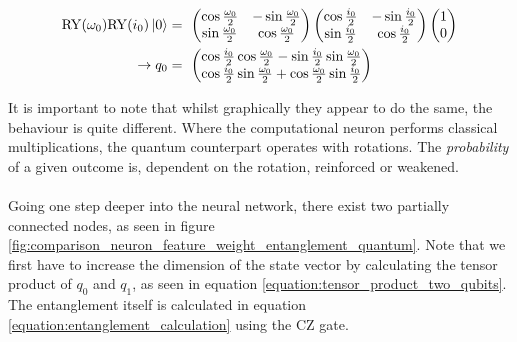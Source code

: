 \begin{equation}
    \centering
    \begin{split}
        \mathrm{RY}(\omega_0)\mathrm{RY}(i_0)\ket{0} &=\ \begin{pmatrix}
        \cos{\frac{\omega_0}{2}} & -\sin{\frac{\omega_0}{2}} \\
        \sin{\frac{\omega_0}{2}} & \cos{\frac{\omega_0}{2}}
    \end{pmatrix}\begin{pmatrix}
        \cos{\frac{i_0}{2}} & -\sin{\frac{i_0}{2}} \\
        \sin{\frac{i_0}{2}} & \cos{\frac{i_0}{2}}
    \end{pmatrix} \begin{pmatrix}
        1 \\ 0
    \end{pmatrix}\\ \rightarrow q_0 &=\ \begin{pmatrix}
     \cos\frac{i_{0}}{2}\cos\frac{\omega_{0}}{2} - \sin\frac{i_{0}}{2}\sin\frac{\omega_{0}}{2}\\
     \cos\frac{i_{0}}{2}\sin\frac{\omega_{0}}{2} + \cos\frac{\omega_{0}}{2}\sin\frac{i_{0}}{2}\\
     \end{pmatrix}
    \end{split}
    \label{equation:quantum_feature_weight}
\end{equation}

It is important to note that whilst graphically they appear to do the same, the behaviour is quite different. Where the computational neuron performs classical multiplications, the quantum counterpart operates with rotations. The \emph{probability} of a given outcome is, dependent on the rotation, reinforced or weakened.

\paragraph{}
Going one step deeper into the neural network, there exist two partially connected nodes, as seen in figure \ref{fig:comparison_neuron_feature_weight_entanglement_quantum}. Note that we first have to increase the dimension of the state vector by calculating the tensor product of $q_0$ and $q_1$, as seen in equation \ref{equation:tensor_product_two_qubits}. The entanglement itself is calculated in equation \ref{equation:entanglement_calculation} using the $\mathrm{CZ}$ gate.

\clearpage

